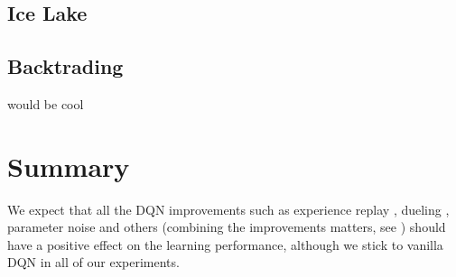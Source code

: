 \subsection{Ice Lake}


\subsection{Backtrading}
would be cool

\section{Summary}
We expect that all the DQN improvements such as experience replay \cite{...}, dueling \cite{...}, parameter noise \cite{...} and others (combining the improvements matters, see \cite{...}) should have a positive effect on the learning performance, although we stick to vanilla DQN in all of our experiments.

